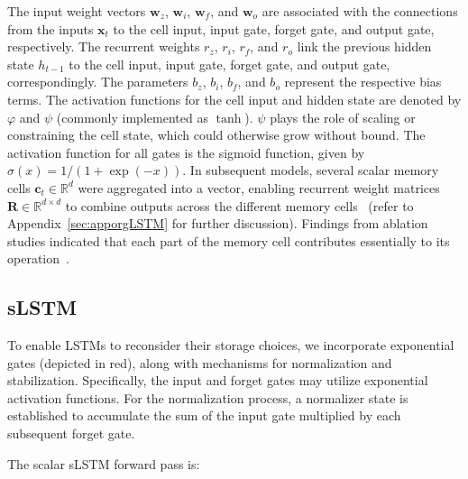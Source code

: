 The input weight vectors $\mathbf{w}_{z}$, $\mathbf{w}_{i}$,
$\mathbf{w}_{f}$, and $\mathbf{w}_{o}$ are associated with the connections from the inputs $\mathbf{x}_t$ to the cell input, input gate, forget gate, and output gate, respectively. The recurrent weights $r_{z}$, $r_{i}$, $r_{f}$, and $r_{o}$ link the previous hidden state $h_{t-1}$ to the cell input, input gate, forget gate, and output gate, correspondingly. The parameters $b_{z}$, $b_{i}$, $b_{f}$, and $b_{o}$ represent the respective bias terms.
The activation functions for the cell input and hidden state are denoted by $\varphi$ and $\psi$ (commonly implemented as $\tanh$).
$\psi$ plays the role of scaling or constraining the cell state, which could otherwise grow without bound. The activation function for all gates is the sigmoid function, given by $\sigma \left( x \right) = 1/(1+\exp(-x))$.
In subsequent models, several scalar memory cells $\mathbf{c}_t \in \mathbb{R}^{d}$ were aggregated into a vector, enabling recurrent weight matrices $\mathbf{R} \in \mathbb{R}^{d \times d}$ to combine outputs across the different memory cells~\citep{Greff:15} (refer to Appendix~\ref{sec:apporgLSTM} for further discussion).
Findings from ablation studies indicated that each part of the memory cell contributes essentially to its operation~\citep{Greff:15}.

\subsection{sLSTM}
\label{sec:sLSTM}

To enable LSTMs to reconsider their storage choices, we incorporate exponential gates (depicted in red), along with mechanisms for normalization and stabilization. Specifically, the input and forget gates may utilize exponential activation functions. For the normalization process, a normalizer state is established to accumulate the sum of the input gate multiplied by each subsequent forget gate.

The scalar sLSTM forward pass is:

